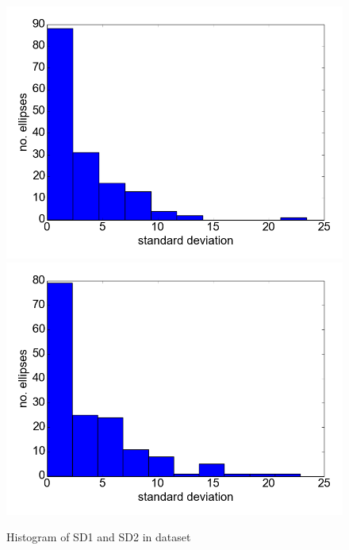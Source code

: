 \documentclass[12pt]{article}
\begin{document}
\begin{figure}
  \centering
  \includegraphics[scale=0.6]{sd1_histogram}
  \includegraphics[scale=0.6]{sd2_histogram}
  \caption{Histogram of SD1 and SD2 in dataset}
  \label{fig:ellipse_histogram}
\end{figure}
\end{document}
